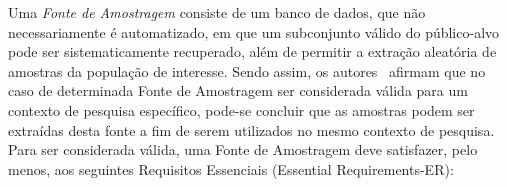 
Uma \textit{Fonte de Amostragem} consiste de um banco de dados, que não
necessariamente é automatizado, em que um subconjunto válido do público-alvo
pode ser sistematicamente recuperado, além de permitir a extração aleatória de
amostras da população de interesse. Sendo assim, os autores~\cite{de2014towards}
afirmam que no caso de determinada Fonte de Amostragem ser considerada válida
para um contexto de pesquisa específico, pode-se concluir que as amostras podem
ser extraídas desta fonte a fim de serem utilizados no mesmo contexto de
pesquisa. Para ser considerada válida, uma Fonte de Amostragem deve satisfazer,
pelo menos, aos seguintes Requisitos Essenciais (Essential Requirements\@-\@ ER):


